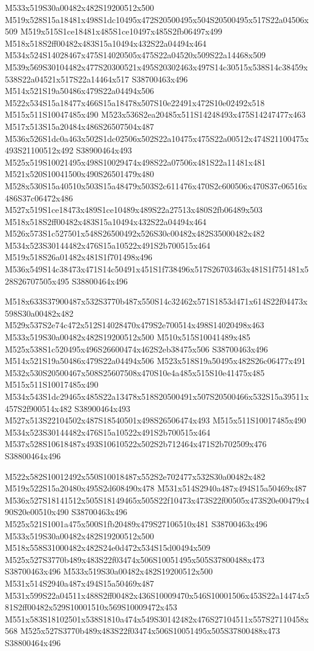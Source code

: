 \documentclass{article}
\begin{document}
\begin{multicols}{2}
M533x519S30a00482x482S19200512x500 M519x528S15a18481x498S1dc10495x472S20500495x504S20500495x517S22a04506x509 M519x515S1ce18481x485S1ce10497x485S2fb06497x499 M518x518S2ff00482x483S15a10494x432S22a04494x464 M534x524S14028467x475S14020505x475S22a04520x509S22a14468x509 M539x569S30104482x477S20300521x495S20302463x497S14c30515x538S14c38459x538S22a04521x517S22a14464x517 S38700463x496 M514x521S19a50486x479S22a04494x506 M522x534S15a18477x466S15a18478x507S10e22491x472S10e02492x518 M515x511S10047485x490 M523x536S2ea20485x511S14248493x475S14247477x463 M517x513S15a20484x486S26507504x487 M536x526S1dc0a463x502S1dc02506x502S22a10475x475S22a00512x474S21100475x493S21100512x492 S38900464x493 M525x519S10021495x498S10029474x498S22a07506x481S22a11481x481 M521x520S10041500x490S26501479x480 M528x530S15a40510x503S15a48479x503S2c611476x470S2c600506x470S37c06516x486S37c06472x486 M527x519S1ce18473x489S1ce10489x489S22a27513x480S2fb06489x503 M518x518S2ff00482x483S15a10494x432S22a04494x464 M526x573S1c527501x548S26500492x526S30c00482x482S35000482x482 M534x523S30144482x476S15a10522x491S2b700515x464 M519x518S26a01482x481S1f701498x496 M536x549S14c38473x471S14c50491x451S1f738496x517S26703463x481S1f751481x528S26707505x495 S38800464x496

M518x633S37900487x532S3770b487x550S14c32462x571S1853d471x614S22f04473x598S30a00482x482 M529x537S2e74c472x512S14028470x479S2e700514x498S14020498x463 M533x519S30a00482x482S19200512x500 M510x515S10041489x485 M525x538S1c520495x496S26600474x462S2eb38475x506 S38700463x496 M514x521S19a50486x479S22a04494x506 M523x518S19a50495x482S26c06477x491 M532x530S20500467x508S25607508x470S10e4a485x515S10e41475x485 M515x511S10017485x490 M534x543S1dc29465x485S22a13478x518S20500491x507S20500466x532S15a39511x457S2f900514x482 S38900464x493 M527x513S22104502x487S18540501x498S26506474x493 M515x511S10017485x490 M534x523S30144482x476S15a10522x491S2b700515x464 M537x528S10618487x493S10610522x502S2b712464x471S2b702509x476 S38800464x496

M522x582S10012492x550S10018487x552S2e702477x532S30a00482x482 M519x522S15a20480x495S2d608490x478 M531x514S2940a487x494S15a50469x487 M536x527S18141512x505S18149465x505S22f10473x473S22f00505x473S20e00479x490S20e00510x490 S38700463x496 M525x521S1001a475x500S1fb20489x479S27106510x481 S38700463x496 M533x519S30a00482x482S19200512x500 M518x558S31000482x482S24e0d472x534S15d00494x509 M525x527S3770b489x483S22f03474x506S10051495x505S37800488x473 S38700463x496 M533x519S30a00482x482S19200512x500 M531x514S2940a487x494S15a50469x487 M531x599S22a04511x488S2ff00482x436S10009470x546S10001506x453S22a14474x581S2ff00482x529S10001510x569S10009472x453 M551x583S18102501x538S1810a474x549S30142482x476S27104511x557S27110458x568 M525x527S3770b489x483S22f03474x506S10051495x505S37800488x473 S38800464x496


\end{multicols}
\end{document}
